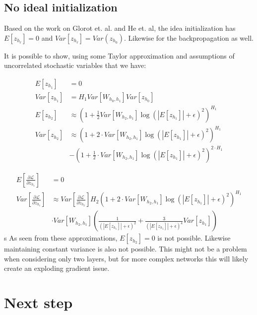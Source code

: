 \documentclass[a4paper]{article}
\begin{document}
\subsection{No ideal initialization}

Based on the work on Glorot et. al. and He et. al, the idea initialization has $E[z_{h_\ell}] = 0$ and $Var[z_{h_\ell}] = Var(z_{h_0})$. Likewise for the backpropagation as well.

It is possible to show, using some Taylor approximation and assumptions of uncorrelated stochastic variables that we have:

\begin{equation}
\begin{aligned}
E[z_{h_1}] &= 0 \\
Var[z_{h_1}] &= H_1 Var\left[W_{h_0, h_1}\right] Var[z_{h_0}]\\
E[z_{h_2}] &\approx\left(1 + \frac{1}{2} Var[W_{h_2, h_1}] \log(|E[z_{h_1}]| + \epsilon)^2\right)^{H_1} \\
Var[z_{h_2}] &\approx \left(1 + 2 \cdot Var[W_{h_2, h_1}] \log(|E[z_{h_1}]| + \epsilon)^2\right)^{H_1} \\
&- \left(1 + \frac{1}{2} \cdot Var[W_{h_2, h_1}] \log(|E[z_{h_1}]| + \epsilon)^2\right)^{2\cdot H_1}
\end{aligned}
\end{equation}

\begin{equation}
\begin{aligned}
E\left[\frac{\partial \mathcal{L}}{\partial z_{h_1}}\right] &= 0 \\
Var\left[\frac{\partial \mathcal{L}}{\partial z_{h_1}}\right] &\approx Var\left[\frac{\partial \mathcal{L}}{\partial z_{h_2}}\right] H_2 \left(1 + 2 \cdot Var[W_{h_2, h_1}] \log(|E[z_{h_1}]| + \epsilon)^2\right)^{H_1} \\
&\cdot Var[W_{h_2, h_1}] \left(\frac{1}{\left(|E[z_{h_1}]| + \epsilon\right)^2} + \frac{3}{\left(|E[z_{h_1}]| + \epsilon\right)^4} Var[z_{h_1}]\right)
\end{aligned}
\end{equation}
s
As seen from these approximations, $E[z_{h_2}] = 0$ is not possible. Likewise maintaining constant variance is also not possible. This might not be a problem when considering only two layers, but for more complex networks this will likely create an exploding gradient issue.

\section{Next step}
\end{document}
